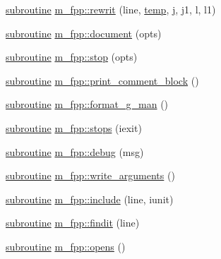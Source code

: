 \begin{DoxyCompactItemize}
\item 
\hyperlink{M__stopwatch_83_8txt_acfbcff50169d691ff02d4a123ed70482}{subroutine} \hyperlink{namespacem__fpp_aae0bad1c7d831068e28f5658d3e1827c}{m\+\_\+fpp\+::rewrit} (line, \hyperlink{temp_8f90_ae3dd9015488975da65db0e05e1d019c3}{temp}, \hyperlink{exit_87_8txt_a8921ef29c441e427867c54bd3b2462ba}{j}, j1, l, l1)
\item 
\hyperlink{M__stopwatch_83_8txt_acfbcff50169d691ff02d4a123ed70482}{subroutine} \hyperlink{namespacem__fpp_a36ad74639f1f01dd0ac08e59e6943778}{m\+\_\+fpp\+::document} (opts)
\item 
\hyperlink{M__stopwatch_83_8txt_acfbcff50169d691ff02d4a123ed70482}{subroutine} \hyperlink{namespacem__fpp_a636643b9e9981243fa2206a3368d01bf}{m\+\_\+fpp\+::stop} (opts)
\item 
\hyperlink{M__stopwatch_83_8txt_acfbcff50169d691ff02d4a123ed70482}{subroutine} \hyperlink{namespacem__fpp_a27e4c26021feb655e915c1835e40e8f4}{m\+\_\+fpp\+::print\+\_\+comment\+\_\+block} ()
\item 
\hyperlink{M__stopwatch_83_8txt_acfbcff50169d691ff02d4a123ed70482}{subroutine} \hyperlink{namespacem__fpp_ae366d933366dea7f28b44653b5ef04d6}{m\+\_\+fpp\+::format\+\_\+g\+\_\+man} ()
\item 
\hyperlink{M__stopwatch_83_8txt_acfbcff50169d691ff02d4a123ed70482}{subroutine} \hyperlink{namespacem__fpp_a66a3f9b0087d5808a36fe4c19c47b51c}{m\+\_\+fpp\+::stops} (iexit)
\item 
\hyperlink{M__stopwatch_83_8txt_acfbcff50169d691ff02d4a123ed70482}{subroutine} \hyperlink{namespacem__fpp_a6044fedc32afb4caa50f83a17d324e5b}{m\+\_\+fpp\+::debug} (msg)
\item 
\hyperlink{M__stopwatch_83_8txt_acfbcff50169d691ff02d4a123ed70482}{subroutine} \hyperlink{namespacem__fpp_a2b24b85d02a85630ee16ee81d5277c28}{m\+\_\+fpp\+::write\+\_\+arguments} ()
\item 
\hyperlink{M__stopwatch_83_8txt_acfbcff50169d691ff02d4a123ed70482}{subroutine} \hyperlink{namespacem__fpp_ae2b0d4bedb5c55788d054fefdef54fcc}{m\+\_\+fpp\+::include} (line, iunit)
\item 
\hyperlink{M__stopwatch_83_8txt_acfbcff50169d691ff02d4a123ed70482}{subroutine} \hyperlink{namespacem__fpp_a53852a7bdeabe727148d17df3448caae}{m\+\_\+fpp\+::findit} (line)
\item 
\hyperlink{M__stopwatch_83_8txt_acfbcff50169d691ff02d4a123ed70482}{subroutine} \hyperlink{namespacem__fpp_a74802eb09b223cb8856d01e9247ff46e}{m\+\_\+fpp\+::opens} ()
\item 

\end{DoxyCompactItemize}
